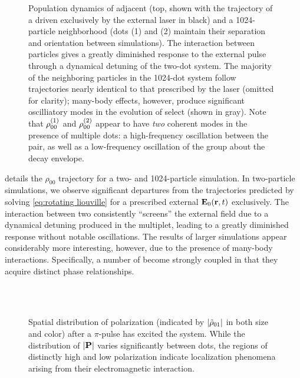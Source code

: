 \begin{figure}
  
  \caption{\label{fig:density stats}Population dynamics of adjacent \qds{} (top, shown with the trajectory of a \qd{} driven exclusively by the external laser in black) and a 1024-particle neighborhood (dots (1) and (2) maintain their separation and orientation between simulations).
    The interaction between particles gives a greatly diminished response to the external pulse through a dynamical detuning of the two-dot system.
    The majority of the neighboring particles in the 1024-dot system follow trajectories nearly identical to that prescribed by the laser (omitted for clarity); many-body effects, however, produce significant oscilliatory modes in the evolution of select \qds{} (shown in gray).
    Note that $\rho_{00}^{\qty(1)}$ and $\rho_{00}^{\qty(2)}$ appear to have \emph{two} coherent modes in the presence of multiple dots: a high-frequency oscillation between the pair, as well as a low-frequency oscillation of the group about the decay envelope.
}
\end{figure}

 details the $\rho_{00}$ trajectory for a two- and 1024-particle simulation.
In two-particle simulations, we observe significant departures from the trajectories predicted by solving \cref{eq:rotating liouville} for a prescribed external $\vb{E}_0(\vb{r}, t)$ exclusively.
The interaction between two \qds{} consistently ``screens'' the external field due to a dynamical detuning produced in the multiplet, leading to a greatly diminished response without notable oscillations.
The results of larger simulations appear considerably more interesting, however, due to the presence of many-body interactions.
Specifically, a number of \qds{} become strongly coupled in that they acquire distinct phase relationships.

\begin{figure}
  \centering
   \\
   \\

  \caption{\label{fig:polarization vis}Spatial distribution of polarization (indicated by $\abs{\tilde{\rho}_{01}}$ in both size and color) after a $\pi$-pulse has excited the system.
  While the distribution of $\abs{\vb{P}}$ varies significantly between dots, the regions of distinctly high and low polarization indicate localization phenomena arising from their electromagnetic interaction.}
\end{figure}

\lipsum
